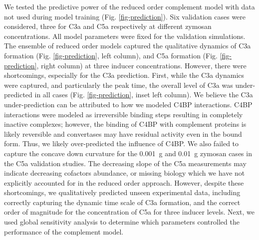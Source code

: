 \documentclass[12pt]{article}
\begin{document}
We tested the predictive power of the reduced order complement model with data not used during model training (Fig. \ref{fig-prediction}).
Six validation cases were considered, three for C3a and C5a respectively at different zymosan concentrations.
All model parameters were fixed for the validation simulations.
The ensemble of reduced order models captured the qualitative dynamics of C3a formation (Fig. \ref{fig-prediction}, left column), and C5a formation (Fig. \ref{fig-prediction}, right column) at three inducer concentrations.
However, there were shortcomings, especially for the C3a prediction.
First, while the C3a dynamics were captured, and particularly the peak time, the overall level of C3a was under-predicted in all cases (Fig. \ref{fig-prediction}, inset left column).
We believe the C3a under-prediction can be attributed to how we modeled C4BP interactions.
C4BP interactions were modeled as irreversible binding steps resulting in completely inactive complexes;
however, the binding of C4BP with complement proteins is likely reversible and convertases may have residual activity even in the bound form.
Thus, we likely over-predicted the influence of C4BP.
We also failed to capture the concave down curvature for the 0.001~g and 0.01~g zymosan cases in the C5a validation studies.
The decreasing slope of the C5a measurements may indicate decreasing cofactors abundance, or missing biology which we have not explicitly accounted for in the reduced order approach.
However, despite these shortcomings, we qualitatively predicted unseen experimental data, including correctly capturing the dynamic time scale of C3a formation,
and the correct order of magnitude for the concentration of C5a for three inducer levels.
Next, we used global sensitivity analysis to determine which parameters controlled the performance of the complement model.


%
\end{document}
